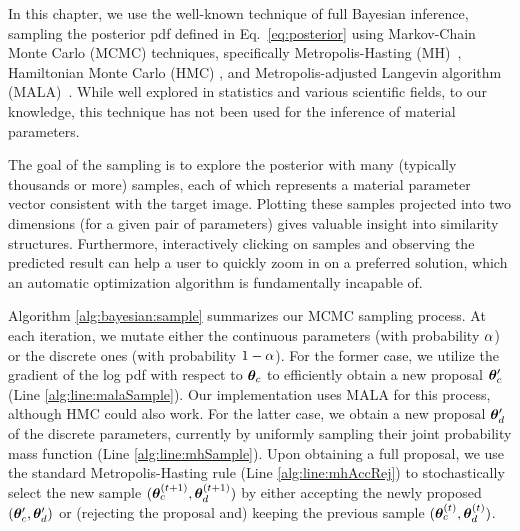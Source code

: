In this chapter, we use the well-known technique of full Bayesian inference, sampling the posterior pdf defined in Eq.~\eqref{eq:posterior} using Markov-Chain Monte Carlo (MCMC) techniques, specifically Metropolis-Hasting (MH)~\cite{hastings1970monte}, Hamiltonian Monte Carlo (HMC) \cite{betancourt2017conceptual}, and Metropolis-adjusted Langevin algorithm (MALA)~\cite{roberts1996exponential}. While well explored in statistics and various scientific fields, to our knowledge, this technique has not been used for the inference of material parameters.

The goal of the sampling is to explore the posterior with many (typically thousands or more) samples, each of which represents a material parameter vector consistent with the target image. Plotting these samples projected into two dimensions (for a given pair of parameters) gives valuable insight into similarity structures. Furthermore, interactively clicking on samples and observing the predicted result can help a user to quickly zoom in on a preferred solution, which an automatic optimization algorithm is fundamentally incapable of.



Algorithm \ref{alg:bayesian:sample} summarizes our MCMC sampling process. At each iteration, we mutate either the continuous parameters (with probability $\alpha$) or the discrete ones (with probability $1 - \alpha$).
For the former case, we utilize the gradient of the log pdf with respect to $\bm{\theta}_c$ to efficiently obtain a new proposal $\bm{\theta}_c'$ (Line \ref{alg:line:malaSample}).
Our implementation uses MALA for this process, although HMC could also work.
For the latter case, we obtain a new proposal $\bm{\theta}_d'$ of the discrete parameters, currently by uniformly sampling their joint probability mass function (Line \ref{alg:line:mhSample}).
Upon obtaining a full proposal, we use the standard Metropolis-Hasting rule (Line \ref{alg:line:mhAccRej}) to stochastically select the new sample $(\bm{\theta}_c^{(t + 1)}, \bm{\theta}_d^{(t + 1)})$ by either accepting the newly proposed $(\bm{\theta}_c', \bm{\theta}_d')$ or (rejecting the proposal and) keeping the previous sample $(\bm{\theta}_c^{(t)}, \bm{\theta}_d^{(t)})$.
